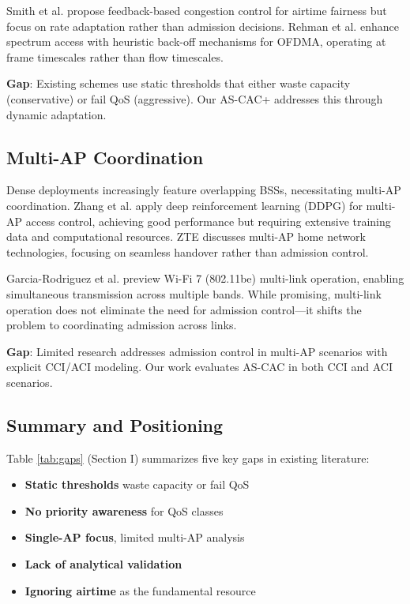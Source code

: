\documentclass[conference]{IEEEtran}
\begin{document}
Smith et al. \cite{16} propose feedback-based congestion control for airtime fairness but focus on rate adaptation rather than admission decisions. Rehman et al. \cite{15} enhance spectrum access with heuristic back-off mechanisms for OFDMA, operating at frame timescales rather than flow timescales.

\textbf{Gap}: Existing schemes use static thresholds that either waste capacity (conservative) or fail QoS (aggressive). Our AS-CAC+ addresses this through dynamic adaptation.

\subsection{Multi-AP Coordination}

Dense deployments increasingly feature overlapping BSSs, necessitating multi-AP coordination. Zhang et al. \cite{18} apply deep reinforcement learning (DDPG) for multi-AP access control, achieving good performance but requiring extensive training data and computational resources. ZTE \cite{19} discusses multi-AP home network technologies, focusing on seamless handover rather than admission control.

Garcia-Rodriguez et al. \cite{5} preview Wi-Fi 7 (802.11be) multi-link operation, enabling simultaneous transmission across multiple bands. While promising, multi-link operation does not eliminate the need for admission control—it shifts the problem to coordinating admission across links.

\textbf{Gap}: Limited research addresses admission control in multi-AP scenarios with explicit CCI/ACI modeling. Our work evaluates AS-CAC in both CCI and ACI scenarios.

\subsection{Summary and Positioning}

Table \ref{tab:gaps} (Section I) summarizes five key gaps in existing literature:
\begin{itemize}
    \item \textbf{Static thresholds} waste capacity or fail QoS
    \item \textbf{No priority awareness} for QoS classes
    \item \textbf{Single-AP focus}, limited multi-AP analysis
    \item \textbf{Lack of analytical validation}
    \item \textbf{Ignoring airtime} as the fundamental resource
\end{itemize}
\end{document}
